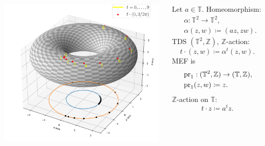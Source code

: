 \begin{frame}
  \begin{columns}
    \begin{column}{0.6\textwidth}
    \centering
      \includegraphics[width=8cm]{imgs/torusSkewRot.pdf}
    \end{column}
    \begin{column}{0.4\textwidth}
  \begin{example}
Let $a \in \mathbb{T}$. Homeomorphism:
\begin{equation*}
  \begin{split}
    &\alpha: \mathbb{T}^2 \to \mathbb{T}^2,\\
  &\alpha (z,w) \coloneq (az,zw).
  \end{split}
  \end{equation*}
     TDS $(\mathbb{T}^2,\mathbb{Z})$, $\mathbb{Z}$-action:
     \begin{equation*}
     t \cdot (z,w) \coloneq \alpha^t (z,w).
     \end{equation*}
     \pause
  MEF is 
  \begin{equation*}
    \begin{split}
     &\operatorname{pr}_1 : (\mathbb{T}^2,\mathbb{Z}) \to (\mathbb{T},\mathbb{Z}), \\
    &\operatorname{pr}_1 (z,w) \coloneq z.
    \end{split}
  \end{equation*}
  $\mathbb{Z}$-action on $\mathbb{T}$:
  \begin{equation*}
   t\cdot  z \coloneq a^tz.
  \end{equation*}
\end{example}
       \end{column}
  \end{columns}
\end{frame}
